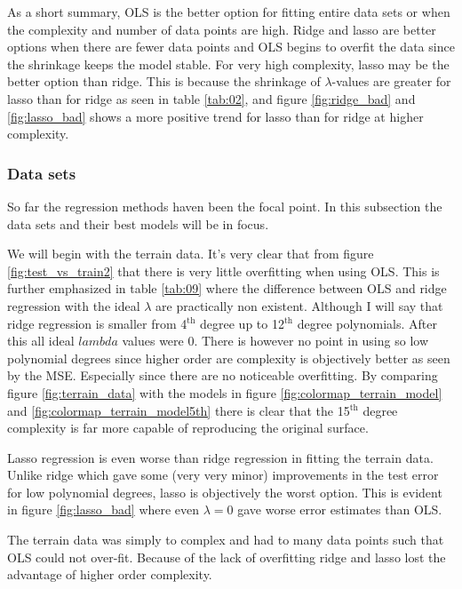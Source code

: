 \documentclass[uio,jmp,amsmath,amssymb,reprint,nofootinbib]{revtex4-1}
\numberwithin{equation}{section}
\begin{document}
As a short summary, OLS is the better option for fitting entire data sets or when the complexity and number of data points are high. Ridge and lasso are better options when there are fewer data points and OLS begins to overfit the data since the shrinkage keeps the model stable. For very high complexity, lasso may be the better option than ridge. This is because the shrinkage of \(\lambda\)-values are greater for lasso than for ridge as seen in table \ref{tab:02}, and figure \ref{fig:ridge_bad} and \ref{fig:lasso_bad} shows a more positive trend for lasso than for ridge at higher complexity.

\subsubsection{Data sets}

So far the regression methods haven been the focal point. In this subsection the data sets and their best models will be in focus.

We will begin with the terrain data. It's very clear that from figure \ref{fig:test_vs_train2} that there is very little overfitting when using OLS. This is further emphasized in table \ref{tab:09} where the difference between OLS and ridge regression with the ideal \(\lambda\) are practically non existent. Although I will say that ridge regression is smaller from 4\(^\text{th}\) degree up to 12\(^\text{th}\) degree polynomials. After this all ideal \(lambda\) values were 0. There is however no point in using so low polynomial degrees since higher order are complexity is objectively better as seen by the MSE. Especially since there are no noticeable overfitting. By comparing figure \ref{fig:terrain_data} with the models in figure \ref{fig:colormap_terrain_model} and \ref{fig:colormap_terrain_model5th} there is clear that the 15\(^\text{th}\) degree complexity is far more capable of reproducing the original surface.

Lasso regression is even worse than ridge regression in fitting the terrain data. Unlike ridge which gave some (very very minor) improvements in the test error for low polynomial degrees, lasso is objectively the worst option. This is evident in figure \ref{fig:lasso_bad} where even \(\lambda = 0\) gave worse error estimates than OLS.

The terrain data was simply to complex and had to many data points such that OLS could not over-fit. Because of the lack of overfitting ridge and lasso lost the advantage of higher order complexity.
\end{document}
